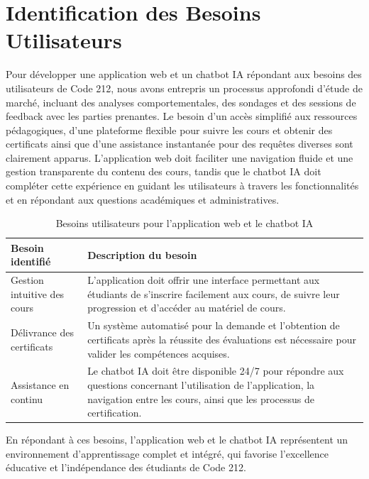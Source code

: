 \documentclass[a4paper, 11pt, openany]{report}
\begin{document}
\section{Identification des Besoins Utilisateurs}
Pour développer une application web et un chatbot IA répondant aux besoins des utilisateurs de Code 212, nous avons entrepris un processus approfondi d'étude de marché, incluant des analyses comportementales, des sondages et des sessions de feedback avec les parties prenantes. Le besoin d'un accès simplifié aux ressources pédagogiques, d'une plateforme flexible pour suivre les cours et obtenir des certificats ainsi que d'une assistance instantanée pour des requêtes diverses sont clairement apparus. L'application web doit faciliter une navigation fluide et une gestion transparente du contenu des cours, tandis que le chatbot IA doit compléter cette expérience en guidant les utilisateurs à travers les fonctionnalités et en répondant aux questions académiques et administratives.

\begin{table}[htp]
\caption{Besoins utilisateurs pour l'application web et le chatbot IA}
\centering
\begin{tabular}{|m{4cm}|m{12cm}|}
\hline
\textbf{Besoin identifié} & \textbf{Description du besoin} \\ \hline
Gestion intuitive des cours & L'application doit offrir une interface permettant aux étudiants de s'inscrire facilement aux cours, de suivre leur progression et d'accéder au matériel de cours. \\ \hline
Délivrance des certificats & Un système automatisé pour la demande et l'obtention de certificats après la réussite des évaluations est nécessaire pour valider les compétences acquises. \\ \hline
Assistance en continu & Le chatbot IA doit être disponible 24/7 pour répondre aux questions concernant l'utilisation de l'application, la navigation entre les cours, ainsi que les processus de certification. \\ \hline
\end{tabular}
\label{tab:user_needs}
\end{table}

En répondant à ces besoins, l'application web et le chatbot IA représentent un environnement d'apprentissage complet et intégré, qui favorise l'excellence éducative et l'indépendance des étudiants de Code 212.
\end{document}
